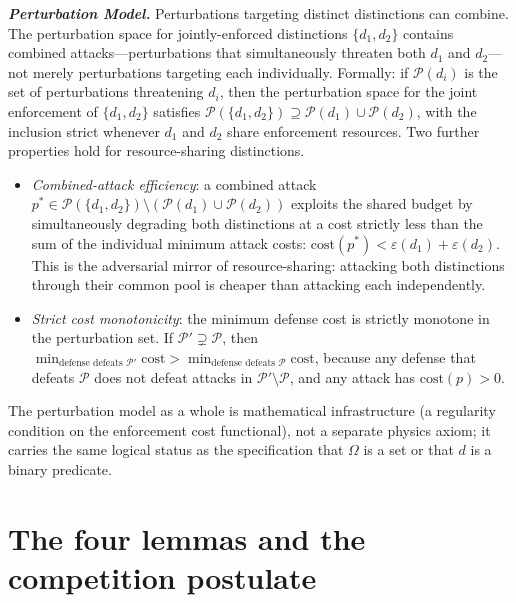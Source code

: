 \documentclass[11pt]{article}
\begin{document}
\begin{tcolorbox}[apfbox, title={Definitions (Distinction, Enforcement Cost, Interface, Admissible State, Capacity)}]
\medskip
\textbf{\textit{Perturbation Model.}} Perturbations targeting distinct distinctions can combine.  The perturbation space for jointly-enforced distinctions $\{d_1, d_2\}$ contains combined attacks---perturbations that simultaneously threaten both $d_1$ and $d_2$---not merely perturbations targeting each individually.  Formally: if $\mathcal{P}(d_i)$ is the set of perturbations threatening $d_i$, then the perturbation space for the joint enforcement of $\{d_1, d_2\}$ satisfies $\mathcal{P}(\{d_1, d_2\}) \supseteq \mathcal{P}(d_1) \cup \mathcal{P}(d_2)$, with the inclusion strict whenever $d_1$ and $d_2$ share enforcement resources.  Two further properties hold for resource-sharing distinctions.
\begin{itemize}[nosep,leftmargin=2em]
  \item \textit{Combined-attack efficiency}: a combined attack $p^* \in \mathcal{P}(\{d_1,d_2\}) \setminus (\mathcal{P}(d_1) \cup \mathcal{P}(d_2))$ exploits the shared budget by simultaneously degrading both distinctions at a cost strictly less than the sum of the individual minimum attack costs: $\mathrm{cost}(p^*) < \varepsilon(d_1) + \varepsilon(d_2)$.  This is the adversarial mirror of resource-sharing: attacking both distinctions through their common pool is cheaper than attacking each independently.
  \item \textit{Strict cost monotonicity}: the minimum defense cost is strictly monotone in the perturbation set.  If $\mathcal{P}' \supsetneq \mathcal{P}$, then $\min_{\text{defense defeats }\mathcal{P}'}\mathrm{cost} > \min_{\text{defense defeats }\mathcal{P}}\mathrm{cost}$, because any defense that defeats $\mathcal{P}$ does not defeat attacks in $\mathcal{P}' \setminus \mathcal{P}$, and any attack has $\mathrm{cost}(p) > 0$.
\end{itemize}
The perturbation model as a whole is mathematical infrastructure (a regularity condition on the enforcement cost functional), not a separate physics axiom; it carries the same logical status as the specification that $\Omega$ is a set or that $d$ is a binary predicate.
\end{tcolorbox}


\section{The four lemmas and the competition postulate}
\label{sec:lemmas}
\end{document}
